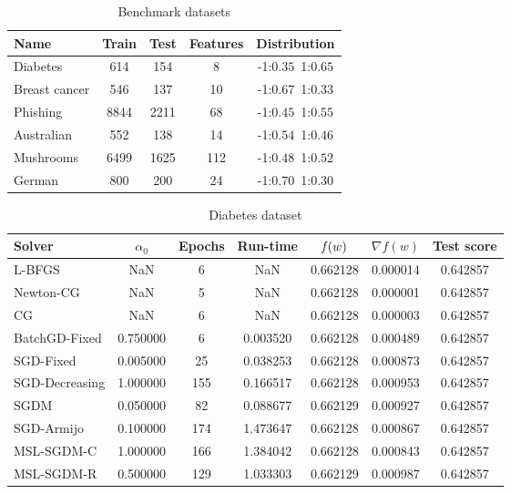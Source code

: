 \begin{table}
\centering
\caption{Benchmark datasets}
\label{tab:datasets}
\begin{tabular}{lSSSc}
\toprule
Name & {Train} & {Test} & {Features} & {Distribution} \\
\midrule
Diabetes & 614 & 154 & 8 & -1:$0.35$\,\,\,1:$0.65$ \\
Breast cancer & 546 & 137 & 10 & -1:$0.67$\,\,\,1:$0.33$ \\
Phishing & 8844 & 2211 & 68 & -1:$0.45$\,\,\,1:$0.55$ \\
Australian & 552 & 138 & 14 & -1:$0.54$\,\,\,1:$0.46$ \\
Mushrooms & 6499 & 1625 & 112 & -1:$0.48$\,\,\,1:$0.52$ \\
German & 800 & 200 & 24 & -1:$0.70$\,\,\,1:$0.30$ \\
\bottomrule
\end{tabular}
\end{table}

\begin{table}
\centering
\caption{Diabetes dataset}
\label{tab:diab-table}
\begin{tabular}{lS[round-precision=3]S[drop-zero-decimal]S[round-precision=4]S[round-precision=6]S[exponent-mode=scientific]S[round-precision=6]}
\toprule
Solver & {$\alpha_0$} & {Epochs} & {Run-time} & {$\operatorname*{\mathit{f}}(w)$} & {$\nabla f(w)$} & {Test score} \\
\midrule
L-BFGS & NaN & 6 & NaN & 0.662128 & 0.000014 & 0.642857 \\
Newton-CG & NaN & 5 & NaN & 0.662128 & 0.000001 & 0.642857 \\
CG & NaN & 6 & NaN & 0.662128 & 0.000003 & 0.642857 \\
BatchGD-Fixed & 0.750000 & 6 & 0.003520 & 0.662128 & 0.000489 & 0.642857 \\
SGD-Fixed & 0.005000 & 25 & 0.038253 & 0.662128 & 0.000873 & 0.642857 \\
SGD-Decreasing & 1.000000 & 155 & 0.166517 & 0.662128 & 0.000953 & 0.642857 \\
SGDM & 0.050000 & 82 & 0.088677 & 0.662129 & 0.000927 & 0.642857 \\
SGD-Armijo & 0.100000 & 174 & 1.473647 & 0.662128 & 0.000867 & 0.642857 \\
MSL-SGDM-C & 1.000000 & 166 & 1.384042 & 0.662128 & 0.000843 & 0.642857 \\
MSL-SGDM-R & 0.500000 & 129 & 1.033303 & 0.662129 & 0.000987 & 0.642857 \\
\bottomrule
\end{tabular}
\end{table}


